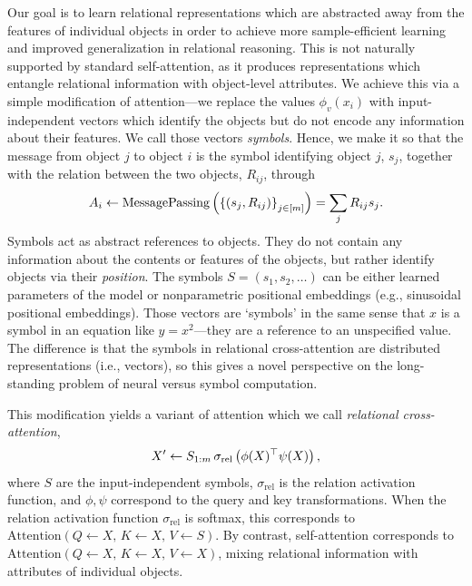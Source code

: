 Our goal is to learn relational representations which are abstracted away from the features of individual objects in order to achieve more sample-efficient learning and improved generalization in relational reasoning. This is not naturally supported by standard self-attention, as it produces representations which entangle relational information with object-level attributes. We achieve this via a simple modification of attention---we replace the values $\phi_v(x_i)$ with input-independent vectors which identify the objects but do not encode any information about their features. We call those vectors \textit{symbols}. Hence, we make it so that the message from object $j$ to object $i$ is the symbol identifying object $j$, $s_j$, together with the relation between the two objects, $R_{ij}$, through
\begin{equation}\label{eq:relational_crossattn_message_passing}
    A_i \gets \mathrm{MessagePassing}\left(\left\{(s_j, R_{ij})\right\}_{j \in [m]}\right) = \sum_{j} R_{ij} s_j.
\end{equation}
Symbols act as abstract references to objects. They do not contain any information about the contents or features of the objects, but rather identify objects via their \textit{position}. The symbols $S = (s_1, s_2, \ldots)$ can be either learned parameters of the model or nonparametric positional embeddings (e.g., sinusoidal positional embeddings). Those vectors are `symbols' in the same sense that $x$ is a symbol in an equation like $y = x^2$---they are a reference to an unspecified value. The difference is that the symbols in relational cross-attention are distributed representations (i.e., vectors), so this gives a novel perspective on the long-standing problem of neural versus symbol computation.

This modification yields a variant of attention which we call \textit{relational cross-attention},
\begin{equation}\label{eq:relational_crossattn}
    X' \gets S_{1:m} \, \sigma_{\mathrm{rel}}\left(\phi(X)^\top \psi(X)\right),
\end{equation}
where $S$ are the input-independent symbols, $\sigma_{\mathrm{rel}}$ is the relation activation function, and $\phi, \psi$ correspond to the query and key transformations. When the relation activation function $\sigma_{\mathrm{rel}}$ is softmax, this corresponds to $\mathrm{Attention}(Q \gets X,\, K \gets X,\, V \gets S)$. By contrast, self-attention corresponds to $\mathrm{Attention}(Q \gets X,\, K \gets X,\, V \gets X)$, mixing relational information with attributes of individual objects.

